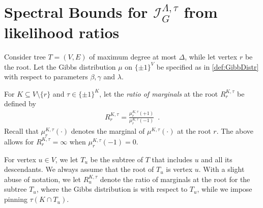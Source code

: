\documentclass[11pt,reqno]{amsart}
\numberwithin{equation}{section}
\newcommand{\cI}{{\mathcal{I}}}
\newcommand{\bluepigment}[1]{{\color{blue(pigment)}#1}}
\newcommand{\bostonuniversityred}[1]{{\color{bostonuniversityred}#1}}
\newcommand{\red}[1]{{\color{red}#1}}
\newcommand{\maxDeg}{{\Delta}}
\newcommand{\gratio}{{R}}
\newcommand{\infmatrix}{\cI}
\newcommand{\spreadpoint}{\newpage}
\newcommand{\LastReviewG}[1]{{\color{magenta}\hspace{.2cm} [Rev: \textrm{#1} - \bluepigment{G} ] \hspace{.2cm}}}
\renewcommand{\LastReviewG}[1]{}
\renewcommand{\spreadpoint}{}
\renewcommand{\bluepigment}[1]{#1}
\renewcommand{\bostonuniversityred}[1]{#1}
\renewcommand{\red}[1]{#1}
\newcommand{\kK}{\bluepigment{K}}
\newcommand{\kr}{\bostonuniversityred{r}}%
\newcommand{\ku}{\red{u}}
\renewcommand{\kK}{K}
\renewcommand{\kr}{r}
\renewcommand{\ku}{u}
\begin{document}
 

\spreadpoint


\section{Spectral Bounds for $\infmatrix^{\Lambda,\tau}_{G}$ from likelihood  ratios \LastReviewG{2025-03-05}}\label{sec:RecursionVsSpectralIneq} 


Consider tree $T=(V,E)$ of maximum degree at most $\maxDeg$, while let vertex $\kr$ be the root. 
%
Let the Gibbs distribution $\mu$ on $\{\pm 1\}^{V}$ be specified as in \eqref{def:GibbDistr} with respect to  parameters $\beta, \gamma$ 
and $\lambda$.






For $\kK \subseteq V\setminus\{\kr\}$ and $\tau\in \{\pm 1\}^{\kK}$, let the {\em ratio of  marginals} at the root 
$\gratio^{\kK, \tau}_{\kr}$ be defined by 
%
\begin{align}\label{eq:DefOfR}
\gratio^{\kK, \tau}_{\kr}=\frac{\mu^{\kK,\tau}_{\kr}(+1)}{\mu^{\kK,\tau}_{\kr}(-1)} \enspace.
\end{align}
Recall that $\mu^{\kK,\tau}_{\kr}(\cdot)$ denotes the marginal of $\mu^{\kK,\tau}(\cdot)$ 
at the root $\kr$. The above allows for $\gratio^{\kK, \tau}_{\kr}=\infty$ when 
$\mu^{\kK,\tau}_{\kr}(-1)=0$.

For vertex $\ku\in V$, we let $T_{\ku}$ be the subtree of $T$ that includes $\ku$ and all its descendants. 
We always assume that the root of $T_{\ku}$ is vertex $\ku$. 
%
With a slight abuse of notation, we let $\gratio^{\kK, \tau}_{\ku}$ denote the ratio of marginals at the root for 
the subtree $T_{\ku}$, where the Gibbs distribution is with respect to $T_{\ku}$, while we impose 
pinning $\tau(\kK\cap T_{\ku})$.


%
\end{document}
